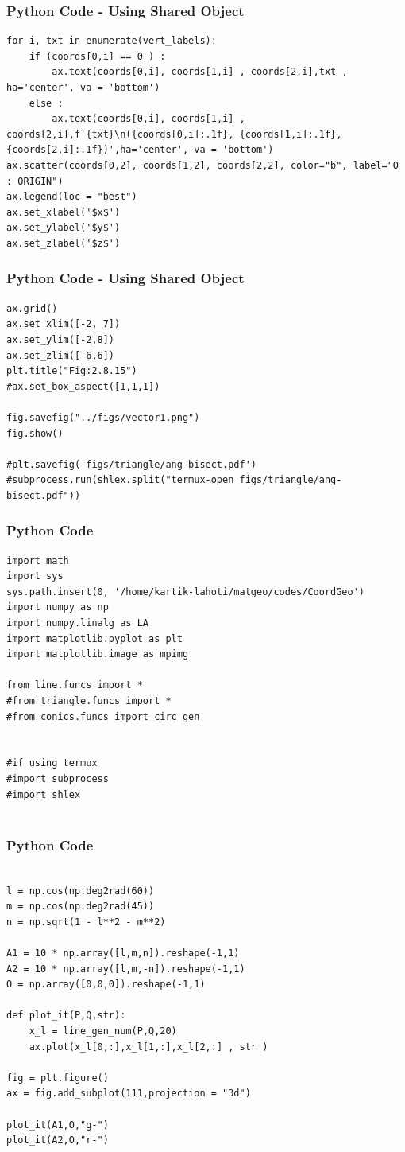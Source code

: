 \documentclass{beamer}
\begin{document}
\begin{frame}[fragile]
    \frametitle{Python Code - Using Shared Object}
    \begin{lstlisting}
for i, txt in enumerate(vert_labels):
    if (coords[0,i] == 0 ) :
        ax.text(coords[0,i], coords[1,i] , coords[2,i],txt , ha='center', va = 'bottom')
    else :
        ax.text(coords[0,i], coords[1,i] , coords[2,i],f'{txt}\n({coords[0,i]:.1f}, {coords[1,i]:.1f}, {coords[2,i]:.1f})',ha='center', va = 'bottom')
ax.scatter(coords[0,2], coords[1,2], coords[2,2], color="b", label="O : ORIGIN")
ax.legend(loc = "best")
ax.set_xlabel('$x$')
ax.set_ylabel('$y$')
ax.set_zlabel('$z$')
\end{lstlisting}
\end{frame}

\begin{frame}[fragile]
    \frametitle{Python Code - Using Shared Object}
    \begin{lstlisting}
ax.grid()
ax.set_xlim([-2, 7])
ax.set_ylim([-2,8])
ax.set_zlim([-6,6])
plt.title("Fig:2.8.15")
#ax.set_box_aspect([1,1,1])

fig.savefig("../figs/vector1.png")
fig.show()

#plt.savefig('figs/triangle/ang-bisect.pdf')
#subprocess.run(shlex.split("termux-open figs/triangle/ang-bisect.pdf"))

\end{lstlisting}
\end{frame}




\begin{frame}[fragile]
    \frametitle{Python Code}
    \begin{lstlisting}
import math
import sys
sys.path.insert(0, '/home/kartik-lahoti/matgeo/codes/CoordGeo')
import numpy as np
import numpy.linalg as LA
import matplotlib.pyplot as plt
import matplotlib.image as mpimg

from line.funcs import *
#from triangle.funcs import *
#from conics.funcs import circ_gen


#if using termux
#import subprocess
#import shlex


\end{lstlisting}
\end{frame}

\begin{frame}[fragile]
    \frametitle{Python Code }
    \begin{lstlisting}

l = np.cos(np.deg2rad(60))
m = np.cos(np.deg2rad(45))
n = np.sqrt(1 - l**2 - m**2)

A1 = 10 * np.array([l,m,n]).reshape(-1,1)
A2 = 10 * np.array([l,m,-n]).reshape(-1,1)
O = np.array([0,0,0]).reshape(-1,1)

def plot_it(P,Q,str):
    x_l = line_gen_num(P,Q,20)
    ax.plot(x_l[0,:],x_l[1,:],x_l[2,:] , str )

fig = plt.figure()
ax = fig.add_subplot(111,projection = "3d")

plot_it(A1,O,"g-")
plot_it(A2,O,"r-")

\end{lstlisting}
\end{frame}
\end{document}
